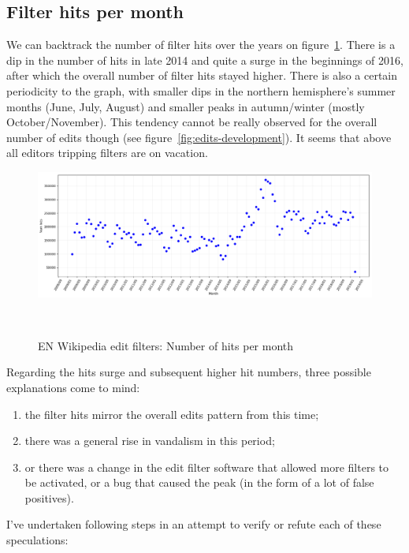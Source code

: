 \subsection{Filter hits per month}

We can backtrack the number of filter hits over the years on figure~\ref{fig:filter-hits}.
There is a dip in the number of hits in late 2014 and quite a surge in the beginnings of 2016, after which the overall number of filter hits stayed higher.
There is also a certain periodicity to the graph, with smaller dips in the northern hemisphere's summer months (June, July, August) and smaller peaks in autumn/winter (mostly October/November).
This tendency cannot be really observed for the overall number of edits though (see figure~\ref{fig:edits-development}).
It seems that above all editors tripping filters are on vacation.

\begin{landscape}
\begin{figure}
\centering
  \includegraphics[width=0.9\columnwidth]{pics/filter-hits-zoomed.png}
  \caption{EN Wikipedia edit filters: Number of hits per month}~\label{fig:filter-hits}
\end{figure}
\end{landscape}

Regarding the hits surge and subsequent higher hit numbers, three possible explanations come to mind:
\begin{enumerate}
    \item the filter hits mirror the overall edits pattern from this time;
    \item there was a general rise in vandalism in this period;
    \item or there was a change in the edit filter software that allowed more filters to be activated, or a bug that caused the peak (in the form of a lot of false positives).
\end{enumerate}

I've undertaken following steps in an attempt to verify or refute each of these speculations:\\

